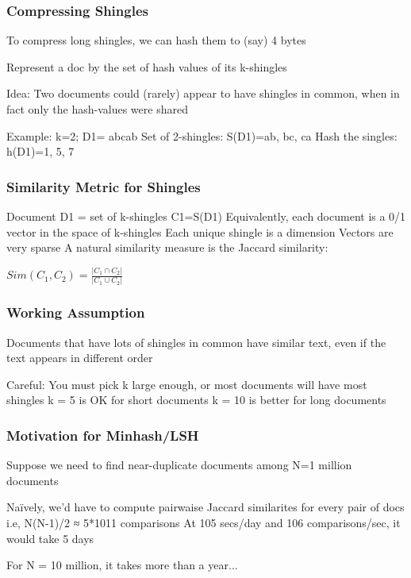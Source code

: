 \documentclass[svgnames]{beamer}
\begin{document}
  
\begin{frame} \frametitle{Compressing Shingles}

To compress long shingles, we can hash them to (say) 4 bytes

Represent a doc by the set of hash values of its k-shingles

Idea: Two documents could (rarely) appear to have shingles in common, when in fact only the hash-values were shared

Example: k=2; D1= abcab
  Set of 2-shingles: S(D1)={ab, bc, ca} 
  Hash the singles: h(D1)={1, 5, 7}

\end{frame}

  
\begin{frame} \frametitle{Similarity Metric for Shingles}


Document D1 = set of k-shingles C1=S(D1)
Equivalently, each document is a 0/1 vector in the space of k-shingles
   Each unique shingle is a dimension
    Vectors are very sparse
A natural similarity measure is the Jaccard similarity:

$Sim(C_1, C_2) = \frac{|C_1 \cap C_2|}{|C_1 \cup C_2|}$

\end{frame}

  
\begin{frame} \frametitle{Working Assumption}

Documents that have lots of shingles in common have similar text, even if the text appears in different order

Careful: You must pick k large enough, or most documents will have most shingles
   k = 5 is OK for short documents
   k = 10 is better for long documents

\end{frame}

  
\begin{frame} \frametitle{Motivation for Minhash/LSH}

Suppose we need to find near-duplicate documents among N=1 million documents

Naïvely, we’d have to compute pairwaise Jaccard similarites for every pair of docs
  i.e, N(N-1)/2 ≈ 5*1011 comparisons
  At 105 secs/day and 106 comparisons/sec, it would take 5 days

For N = 10 million, it takes more than a year...

\end{frame}
\end{document}
